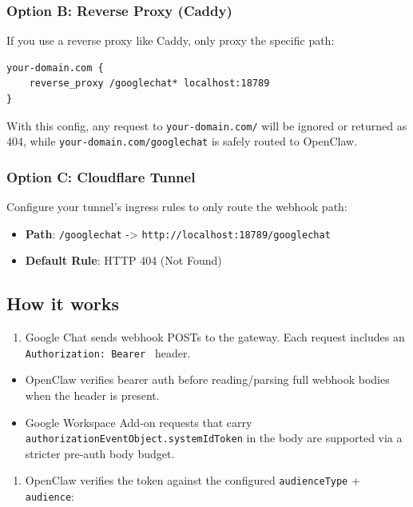 \subsubsection{Option B: Reverse Proxy (Caddy)}


If you use a reverse proxy like Caddy, only proxy the specific path:

\begin{lstlisting}
your-domain.com {
    reverse_proxy /googlechat* localhost:18789
}
\end{lstlisting}


With this config, any request to \texttt{your-domain.com/} will be ignored or returned as 404, while \texttt{your-domain.com/googlechat} is safely routed to OpenClaw.

\subsubsection{Option C: Cloudflare Tunnel}


Configure your tunnel's ingress rules to only route the webhook path:

\begin{itemize}
  \item \textbf{Path}: \texttt{/googlechat} -> \texttt{http://localhost:18789/googlechat}
  \item \textbf{Default Rule}: HTTP 404 (Not Found)
\end{itemize}


\subsection{How it works}


\begin{enumerate}
  \item Google Chat sends webhook POSTs to the gateway. Each request includes an \texttt{Authorization: Bearer } header.
\end{enumerate}

\begin{itemize}
  \item OpenClaw verifies bearer auth before reading/parsing full webhook bodies when the header is present.
  \item Google Workspace Add-on requests that carry \texttt{authorizationEventObject.systemIdToken} in the body are supported via a stricter pre-auth body budget.
\end{itemize}

\begin{enumerate}
  \item OpenClaw verifies the token against the configured \texttt{audienceType} + \texttt{audience}:
\end{enumerate}

